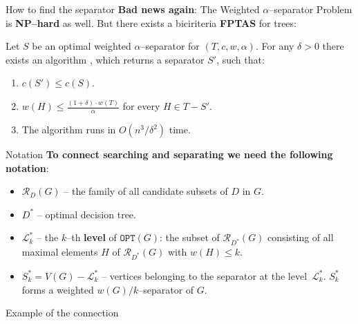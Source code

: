 \documentclass{beamer}
\newcommand{\br}[1]{\mathopen{}\left( #1 \right)}
\newcommand{\OPT}{\texttt{OPT}}
\begin{document}
\begin{frame}{How to find the separator}
\textbf{Bad news again}: The Weighted $\alpha$–separator Problem is \textbf{NP–hard} as well.
\pause
But there exists a biciriteria \textbf{FPTAS} for trees:
\pause
\begin{theorem}
    Let $S$ be an optimal weighted $\alpha$–separator for $\br{T,c,w,\alpha}$. For any $\delta>0$ there exists an algorithm \FSeparatorFPTAS, which returns a separator $S'$, such that:
    \begin{enumerate}
        \pause
        \item $c\br{S'}\leq c\br{S}$.
        \pause
        \item $w\br{H}\leq \frac{\br{1+\delta}\cdot w\br{T}}{\alpha}$ for every $H\in T-S'$.
        \pause
        \item The algorithm runs in $O\br{n^3/\delta^2}$ time.
    \end{enumerate}
\end{theorem}

\end{frame}
\begin{frame}{Notation}
    \textbf{To connect searching and separating we need the following notation}:
    \begin{itemize}
        \item $\mathcal{R}_D\br{G}$ – 
the family of all candidate subsets of $D$ in $G$.
        \pause
        \item $D^*$ – optimal decision tree.
        \pause
        \item $\mathcal{L}_{k}^*$ – the $k$–th \textbf{level} of $\OPT\br{G}$: the subset of $\mathcal{R}_{D^*}\br{G}$
        consisting of all maximal elements $H$ of $\mathcal{R}_{D^*}\br{G}$ with $w\br{H} \leq k$.  
        \pause
        \item $S_{k}^* = V\br{G} - \mathcal{L}_{k}^*$ – vertices belonging to the separator at the level~$\mathcal{L}_{k}^*$. $S_{k}^*$ forms a weighted $w\br{G}/k$–separator of $G$.
    \end{itemize}

\end{frame}
\begin{frame}{Example of the connection}

\end{frame}
\end{document}

